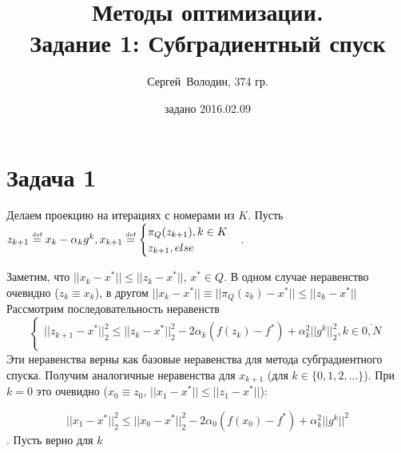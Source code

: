 \documentclass[a4paper]{article}
\title{Методы оптимизации.\\Задание 1: Субградиентный спуск}
\date{задано 2016.02.09}
\author{Сергей~Володин, 374 гр.}
\def\eqdef{\overset{\mbox{\tiny def}}{=}}
\begin{document}
\maketitle
\section*{Задача 1}
Делаем проекцию на итерациях с номерами из $K$. Пусть $z_{k+1}\eqdef x_k-\alpha_kg^k, x_{k+1}\eqdef\begin{cases}
\pi_Q(z_{k+1}), k\in K\\
z_{k+1}, else
\end{cases}$.

Заметим, что $||x_k-x^*||\leqslant||z_k-x^*||$, $x^*\in Q$. В одном случае неравенство очевидно ($z_k\equiv x_k$), в другом $||x_k-x^*||\equiv||\pi_Q(z_k)-x^*||\leqslant ||z_k-x^*||$
Рассмотрим последовательность неравенств $$\begin{cases}
||z_{k+1}-x^*||_2^2\leqslant||z_k-x^*||_2^2-2\alpha_k(f(z_k)-f^*)+\alpha_k^2||g^k||_2^2, k\in\overline{0,N} \\
\end{cases}$$
Эти неравенства верны как базовые неравенства для метода субградиентного спуска.
Получим аналогичные неравенства для $x_{k+1}$ (для $k\in\{0,1,2,...\}$). При $k=0$ это очевидно ($x_0\equiv z_0$, $||x_1-x^*||\leqslant||z_1-x^*||$):

$$||x_1-x^*||_2^2\leqslant||x_0-x^*||_2^2-2\alpha_0(f(x_0)-f^*)+\alpha_k^2||g^k||^2$$. Пусть верно для $k$
\end{document}
